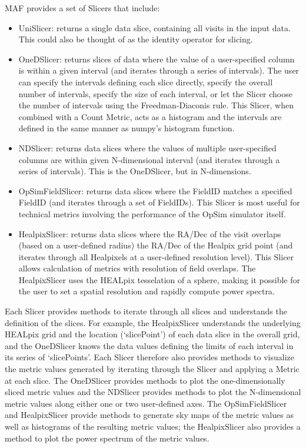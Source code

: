 \documentclass[]{spie}  %
\begin{document}
MAF provides a set of Slicers that include:
\begin{itemize}
\item{UniSlicer: returns a single data slice, containing all visits in
the input data. This could also be thought of as the identity operator
for slicing.}
\item{OneDSlicer: returns slices of data where the value of a
user-specified column is within a given interval (and iterates through
a series of intervals).  The user can specify the intervals defining
each slice directly, specify the overall number of intervals, specify
the size of each interval, or let the Slicer choose the number of
intervals using the Freedman-Diaconis rule. This
Slicer, when combined with a Count Metric, acts as a histogram and the
intervals are defined in the same manner as numpy's histogram
function.}
\item{NDSlicer: returns data slices where the values of multiple
user-specified columns are within given N-dimensional interval (and
iterates through a series of intervals). This is the OneDSlicer, but
in N-dimensions.}
\item{OpSimFieldSlicer: returns data slices where the FieldID
matches a specified FieldID (and iterates through a set of
FieldIDs). This Slicer is most useful for technical metrics involving
the performance of the OpSim simulator itself.}
\item{HealpixSlicer: returns data slices where the RA/Dec of the
visit overlaps (based on a user-defined radius) the RA/Dec of the
Healpix grid point (and iterates through all Healpixels at a
user-defined resolution level). This Slicer allows calculation of
metrics with resolution of field overlaps. The HealpixSlicer uses the 
HEALpix tesselation of a sphere\cite{healpix}, 
making it possible for the 
user to set a spatial resolution and rapidly compute power spectra.}
\end{itemize}
Each Slicer provides methods to iterate through all slices and
understands the definition of the slices. For example, the
HealpixSlicer understands the underlying HEALpix grid and the location (`slicePoint')
of each data slice in the overall grid, and the OneDSlicer knows the
data values defining the limits of each interval in its series of
`slicePoints'.  Each Slicer therefore also
provides methods to visualize the metric values generated by iterating
through the Slicer and applying a Metric at each slice. The OneDSlicer provides methods to plot the
one-dimensionally sliced metric values and the NDSlicer provides methods to plot
the N-dimensional metric values along either one or two user-defined
axes. The OpSimFieldSlicer and HealpixSlicer provide methods to
generate sky maps of the metric values as well as histograms of the
resulting metric values; the HealpixSlicer also provides a method to
plot the power spectrum of the metric values. 
\end{document}
